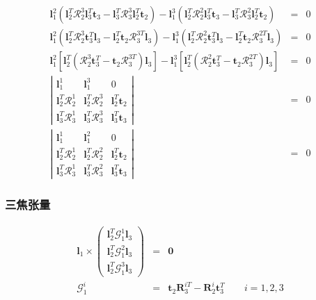 \documentclass{beamer}
\newcommand{\nospace}{}
\newcommand{\tmmathbf}[1]{\ensuremath{\boldsymbol{#1}}}
\begin{document}
{{\begin{frame}
\begin{eqnarray*}
    \tmmathbf{l}_1^2 (\tmmathbf{l}_2^T \mathcal{R}_2^3 \tmmathbf{l}_3^T
    \tmmathbf{t}_3 -\tmmathbf{l}_3^T \mathcal{R}_3^3 \tmmathbf{l}_2^T
    \tmmathbf{t}_2) -\tmmathbf{l}_1^3 (\tmmathbf{l}_2^T \mathcal{R}_2^2
    \tmmathbf{l}_3^T \tmmathbf{t}_3 -\tmmathbf{l}_3^T \mathcal{R}_3^2
    \tmmathbf{l}_2^T \tmmathbf{t}_2) & = & 0\\
    \tmmathbf{l}_1^2 (\tmmathbf{l}_2^T \mathcal{R}_2^3 \tmmathbf{t}_3^T
    \tmmathbf{l}_3 -\tmmathbf{l}_2^T \tmmathbf{t}_2 \mathcal{R}_3^{3 T}
    \tmmathbf{l}_3) -\tmmathbf{l}_1^3 (\tmmathbf{l}_2^T \mathcal{R}_2^2
    \tmmathbf{t}_3^T \tmmathbf{l}_3 -\tmmathbf{l}_2^T \tmmathbf{t}_2
    \mathcal{R}_3^{2 T} \tmmathbf{l}_3) & = & 0\\
    \tmmathbf{l}_1^2 [\tmmathbf{l}_2^T (\mathcal{R}_2^3 \tmmathbf{t}_3^T
    -\tmmathbf{t}_2 \mathcal{R}_3^{3 T}) \tmmathbf{l}_3] -\tmmathbf{l}_1^3
    [\tmmathbf{l}_2^T (\mathcal{R}_2^2 \tmmathbf{t}_3^T -\tmmathbf{t}_2
    \mathcal{R}_3^{2 T}) \tmmathbf{l}_3] & = & 0\\
    \left|\begin{array}{ccc}
      \tmmathbf{l}_1^1 & \tmmathbf{l}_1^3 & 0\\
      \tmmathbf{l}_2^T \mathcal{R}_2^1 & \tmmathbf{l}_2^T \mathcal{R}_2^3 &
      \tmmathbf{l}_2^T \tmmathbf{t}_2\\
      \tmmathbf{l}_3^T \mathcal{R}_3^1 & \tmmathbf{l}_3^T \mathcal{R}_3^3 &
      \tmmathbf{l}_3^T \tmmathbf{t}_3
    \end{array}\right| & = & 0\\
    \left|\begin{array}{ccc}
      \tmmathbf{l}_1^1 & \tmmathbf{l}_1^2 & 0\\
      \tmmathbf{l}_2^T \mathcal{R}_2^1 & \tmmathbf{l}_2^T \mathcal{R}_2^2 &
      \tmmathbf{l}_2^T \tmmathbf{t}_2\\
      \tmmathbf{l}_3^T \mathcal{R}_3^1 & \tmmathbf{l}_3^T \mathcal{R}_3^2 &
      \tmmathbf{l}_3^T \tmmathbf{t}_3
    \end{array}\right| & = & 0
  \end{eqnarray*}
  
\end{frame}}{\begin{frame}
  \frametitle{三焦张量}
  
  
  \begin{eqnarray*}
    \tmmathbf{l}_1 \times \left(\begin{array}{c}
      \tmmathbf{l}_2^T \mathcal{G}_1^1 \tmmathbf{l}_3\\
      \tmmathbf{l}_2^T \mathcal{G}_1^2 \tmmathbf{l}_3\\
      \tmmathbf{l}_2^T \mathcal{G}_1^3 \tmmathbf{l}_3
    \end{array}\right) & = & \tmmathbf{0}\\
    \mathcal{G}_1^i & = & \tmmathbf{t}_2 \tmmathbf{R}_3^{i \nospace T}
    -\tmmathbf{R}_2^i \tmmathbf{t}_3^T \qquad i = 1, 2, 3
  \end{eqnarray*}
  

\end{frame}}}
\end{document}
